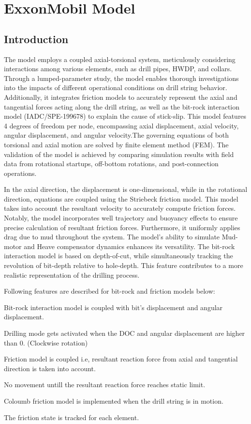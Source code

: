 \chapter{ExxonMobil Model}
\label{ch:exxonmobilmodel}

\section{Introduction}
The model employs a coupled axial-torsional system, meticulously considering interactions among various elements, such as drill pipes, HWDP, and collars. Through a lumped-parameter study, the model enables thorough investigations into the impacts of different operational conditions on drill string behavior. Additionally, it integrates friction models to accurately represent the axial and tangential forces acting along the drill string, as well as the bit-rock interaction model (IADC/SPE-199678) to explain the cause of stick-slip. This model features 4 degrees of freedom per node, encompassing axial displacement, axial velocity, angular displacement, and angular velocity.The governing equations of both torsional and axial motion are solved by finite element method (FEM). The validation of the model is achieved by comparing simulation results with field data from rotational startups, off-bottom rotations, and post-connection operations. 

In the axial direction, the displacement is one-dimensional, while in the rotational direction, equations are coupled using the Striebeck friction model. This model takes into account the resultant velocity to accurately compute friction forces. Notably, the model incorporates well trajectory and buoyancy effects to ensure precise calculation of resultant friction forces. Furthermore, it uniformly applies drag due to mud throughout the system. The model's ability to simulate Mud-motor and Heave compensator dynamics enhances its versatility. The bit-rock interaction model is based on depth-of-cut, while simultaneously tracking the revolution of bit-depth relative to hole-depth. This feature contributes to a more realistic representation of the drilling process.

Following features are described for bit-rock and friction models below:
\begin{bulletedlist}
    \item Bit-rock interaction model is coupled with bit's displacement and angular displacement.
    \item Drilling mode gets activated when the DOC and angular displacement are higher than 0. (Clockwise rotation) 
    \item Friction model is coupled i.e, resultant reaction force from axial and tangential direction is taken into account.
    \item No movement untill the resultant reaction force reaches static limit.
    \item Coloumb friction model is implemented when the drill string is in motion.
    \item The friction state is tracked for each element.
\end{bulletedlist}

